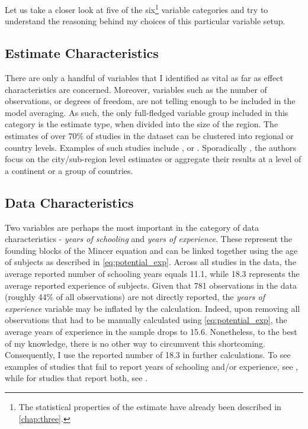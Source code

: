 Let us take a closer look at five of the six\footnote{The statistical properties of the estimate have already been described in \autoref{chap:three}.} variable categories and try to understand the reasoning behind my choices of this particular variable setup.

\subsection{Estimate Characteristics}
\label{subsec:estimate_char}

There are only a handful of variables that I identified as vital as far as effect characteristics are concerned. Moreover, variables such as the number of observations, or degrees of freedom, are not telling enough to be included in the model averaging. As such, the only full-fledged variable group included in this category is the estimate type, when divided into the size of the region. The estimates of over 70\% of studies in the dataset can be clustered into regional or country levels. Examples of such studies include \cite{walker2008college, fang2012returns}, or \cite{angrist1991compulsory}. Sporadically \citep{krafft2019what, chanis2021tell}, the authors focus on the city/sub-region level estimates or aggregate their results at a level of a continent or a group of countries.

\subsection{Data Characteristics}
\label{subsec:data_char}

Two variables are perhaps the most important in the category of data characteristics - \textit{years of schooling} and \textit{years of experience}. These represent the founding blocks of the Mincer equation and can be linked together using the age of subjects as described in \autoref{eq:potential_exp}. Across all studies in the data, the average reported number of schooling years equals 11.1, while 18.3 represents the average reported experience of subjects. Given that 781 observations in the data (roughly 44\% of all observations) are not directly reported, the \textit{years of experience} variable may be inflated by the calculation. Indeed, upon removing all observations that had to be manually calculated using \autoref{eq:potential_exp}, the average years of experience in the sample drops to 15.6. Nonetheless, to the best of my knowledge, there is no other way to circumvent this shortcoming. Consequently, I use the reported number of 18.3 in further calculations. To see examples of studies that fail to report years of schooling and/or experience, see \cite{pischke2005zero, psacharopoulos1982earnings}, while for studies that report both, see \cite{belzil2002unobserved, girma2005heterogeneity}.

